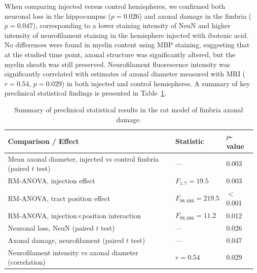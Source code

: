 \documentclass[11pt]{article}
\begin{document}
When comparing injected versus control hemispheres, we confirmed both neuronal loss in the hippocampus ($p=0.026$) and axonal damage in the fimbria ($p=0.047$), corresponding to a lower staining intensity of NeuN and higher intensity of neurofilament staining in the hemisphere injected with ibotenic acid. No differences were found in myelin content using MBP staining, suggesting that at the studied time point, axonal structure was significantly altered, but the myelin sheath was still preserved. Neurofilament fluorescence intensity was significantly correlated with estimates of axonal diameter measured with MRI ($r=0.54$, $p=0.029$) in both injected and control hemispheres. A summary of key preclinical statistical findings is presented in Table~\ref{tab:preclinical}.

\begin{table}[h]
\centering
\caption{Summary of preclinical statistical results in the rat model of fimbria axonal damage.}
\label{tab:preclinical}
\begin{tabular}{lll}
\toprule
Comparison / Effect & Statistic & $p$-value \\
\midrule
Mean axonal diameter, injected vs control fimbria (paired $t$ test) & --- & 0.003 \\
RM-ANOVA, injection effect                                         & $F_{1,7}=19.5$       & 0.003 \\
RM-ANOVA, tract position effect                                    & $F_{98,686}=219.5$   & $<$0.001 \\
RM-ANOVA, injection$\times$position interaction                    & $F_{98,686}=11.2$    & 0.012 \\
Neuronal loss, NeuN (paired $t$ test)                              & --- & 0.026 \\
Axonal damage, neurofilament (paired $t$ test)                     & --- & 0.047 \\
Neurofilament intensity vs axonal diameter (correlation)           & $r=0.54$             & 0.029 \\
\bottomrule
\end{tabular}
\end{table}
\end{document}
